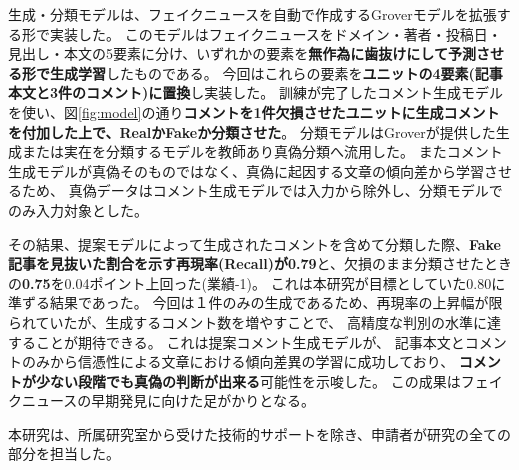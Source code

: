 {	生成・分類モデルは、フェイクニュースを自動で作成するGroverモデル\cite{NIPS2019_9106}を拡張する形で実装した。
	このモデルはフェイクニュースをドメイン・著者・投稿日・見出し・本文の5要素に分け、いずれかの要素を\textbf{無作為に歯抜けにして予測させる形で生成学習}したものである。
	今回はこれらの要素を\textbf{ユニットの4要素(記事本文と3件のコメント)に置換}し実装した。
	訓練が完了したコメント生成モデルを使い、図\ref{fig:model}の通り\textbf{コメントを1件欠損させたユニットに生成コメントを付加した上で、RealかFakeか分類させた}。
	分類モデルはGroverが提供した生成または実在を分類するモデルを教師あり真偽分類へ流用した。
	またコメント生成モデルが真偽そのものではなく、真偽に起因する文章の傾向差から学習させるため、
	真偽データはコメント生成モデルでは入力から除外し、分類モデルでのみ入力対象とした。

	その結果、提案モデルによって生成されたコメントを含めて分類した際、\textbf{Fake記事を見抜いた割合を示す再現率(Recall)が0.79}と、欠損のまま分類させたときの\textbf{0.75}を0.04ポイント上回った(業績-1)。
	これは本研究が目標としていた0.80に準ずる結果であった。
	今回は１件のみの⽣成であるため、再現率の上昇幅が限られていたが、⽣成するコメント数を増やすことで、
	⾼精度な判別の⽔準に達することが期待できる。
	これは提案コメント生成モデルが、
	記事本文とコメントのみから信憑性による文章における傾向差異の学習に成功しており、
	\textbf{コメントが少ない段階でも真偽の判断が出来る}可能性を示唆した。
	この成果はフェイクニュースの早期発⾒に向けた足がかりとなる。

	本研究は、所属研究室から受けた技術的サポートを除き、申請者が研究の全ての部分を担当した。

}
